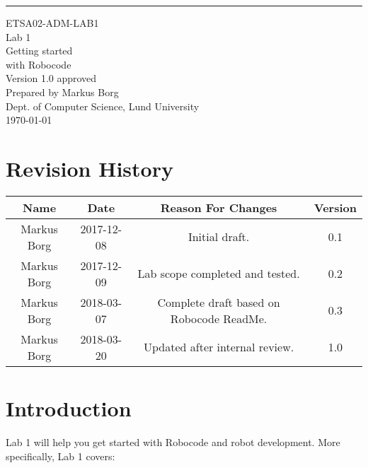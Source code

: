 \documentclass{scrreprt}
\date{}
\def\myversion{1.0 }
\begin{document}
\begin{flushright}
    \rule{16cm}{5pt}\vskip1cm
    \begin{bfseries}
    	\LARGE{ETSA02-ADM-LAB1}\\
    	\vspace{1.5cm}
        \Huge{Lab 1}\\
        \vspace{0.5cm}
        Getting started\\
        \vspace{0.5cm}
        with Robocode\\
        \vspace{1.5cm}
        \LARGE{Version \myversion approved}\\
        \vspace{1.5cm}
        Prepared by Markus Borg\\
        Dept. of Computer Science, Lund University\\
        \vspace{1.5cm}
        \today\\
    \end{bfseries}
\end{flushright}


\chapter*{Revision History}

\begin{center}
    \begin{tabular}{|c|c|c|c|}
        \hline
	    Name & Date & Reason For Changes & Version\\
        \hline
	    Markus Borg & 2017-12-08 & Initial draft. & 0.1\\
        \hline
        Markus Borg & 2017-12-09 & Lab scope completed and tested. & 0.2\\
        \hline
        Markus Borg & 2018-03-07 & Complete draft based on Robocode ReadMe. & 0.3\\
        \hline
        Markus Borg & 2018-03-20 & Updated after internal review. & 1.0\\
        \hline
    \end{tabular}
\end{center}

\chapter{Introduction}
Lab 1 will help you get started with Robocode and robot development. More specifically, Lab 1 covers:
\end{document}
